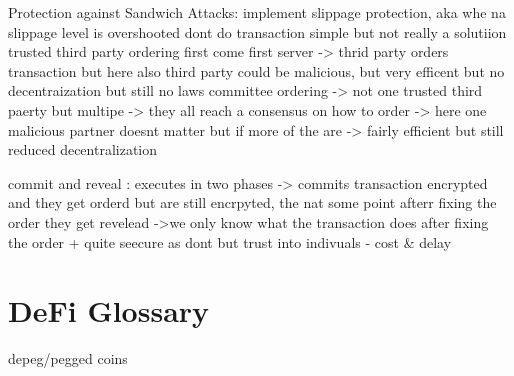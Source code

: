 \documentclass{article}
\begin{document}
Protection against Sandwich Attacks:
implement slippage protection, aka whe na slippage level is overshooted dont do transaction 
simple but not really a solutiion
trusted third party ordering
    first come first server -> thrid party orders transaction but here also third party could be malicious, but very efficent but no decentraization but still no laws 
committee ordering -> not one trusted third paerty but multipe -> they all reach a consensus on how to order -> here one malicious partner doesnt matter but if more of the are -> fairly efficient but still reduced decentralization

commit and reveal : executes in two phases -> commits transaction encrypted and they get orderd but are still encrpyted, the nat some point afterr fixing the order they get revelead ->we only know what the transaction does after fixing the order
+ quite seecure as dont but trust into indivuals
- cost & delay 











\section{DeFi Glossary}
depeg/pegged coins 
\end{document}
